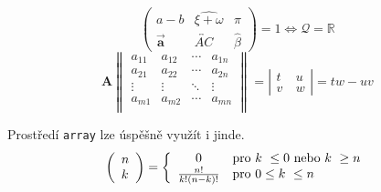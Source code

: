 \documentclass[11pt, twocolumn]{article}
\begin{document}
$$\left(
\begin{array}{ccc}
    a - b & \widehat{\xi + \omega} & \pi \\
    \Vec{\mathbf{a}} & \overleftrightarrow{AC} & \hat{\beta}
\end{array} 
\right)
= 1 \Longleftrightarrow \mathcal{Q} = \mathbb{R}$$
$$\mathbf{A} \left \|
\begin{array}{cccc}
    a_{11} & a_{12} & \cdots & a_{1n} \\
    a_{21} & a_{22} & \cdots & a_{2n} \\
    \vdots &\vdots &\ddots&\vdots\\
    a_{m1} & a_{m2} & \cdots & a_{mn} \\
\end{array}
\right \|
 = \left|
\begin{array}{cc}
     t & u\\
     v~& w
\end{array}
\right| = tw - uv$$

Prostředí \verb|array| lze úspěšně využít i jinde.
$$\left(
\begin{array}{l}
n\\
k
\end{array}
\right) = \left\{
\begin{array}{c l}
    0& \text{pro } k~\le 0 \text{ nebo } k~\ge n\\
    \frac{n!}{k!(n-k)!}& \text{pro } 0 \leq k~\leq n
\end{array}
\right .
$$
\end{document}
